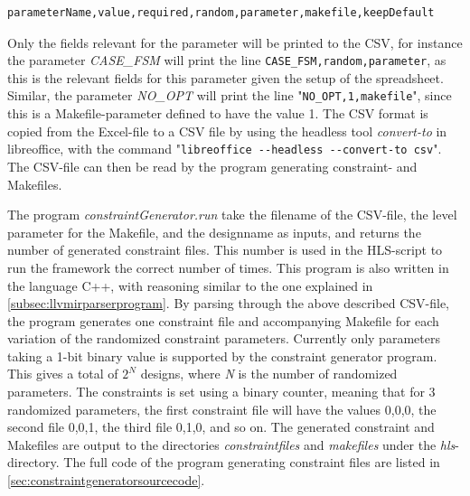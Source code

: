 \begin{verbatim}
parameterName,value,required,random,parameter,makefile,keepDefault
\end{verbatim}
Only the fields relevant for the parameter will be printed to the CSV, for instance the parameter \textit{CASE\_FSM} will print the line \verb!CASE_FSM,random,parameter!, as this is the relevant fields for this parameter given the setup of the spreadsheet. Similar, the parameter \textit{NO\_OPT} will print the line "\verb!NO_OPT,1,makefile!", since this is a Makefile-parameter defined to have the value 1. The CSV format is copied from the Excel-file to a CSV file by using the headless tool \textit{convert-to} in libreoffice, with the command "\verb!libreoffice --headless --convert-to csv!". The CSV-file can then be read by the program generating constraint- and Makefiles. 

The program \textit{constraintGenerator.run} take the filename of the CSV-file, the level parameter for the Makefile, and the designname as inputs, and returns the number of generated constraint files. This number is used in the HLS-script to run the framework the correct number of times. This program is also written in the language C++, with reasoning similar to the one explained in \cref{subsec:llvmirparserprogram}. By parsing through the above described CSV-file, the program generates one constraint file and accompanying Makefile for each variation of the randomized constraint parameters. Currently only parameters taking a 1-bit binary value is supported by the constraint generator program. This gives a total of $2^N$ designs, where \textit{N} is the number of randomized parameters. The constraints is set using a binary counter, meaning that for 3 randomized parameters, the first constraint file will have the values 0,0,0, the second file 0,0,1, the third file 0,1,0, and so on. The generated constraint and Makefiles are output to the directories \textit{constraintfiles} and \textit{makefiles} under the \textit{hls}-directory. The full code of the program generating constraint files are listed in \cref{sec:constraintgeneratorsourcecode}.

